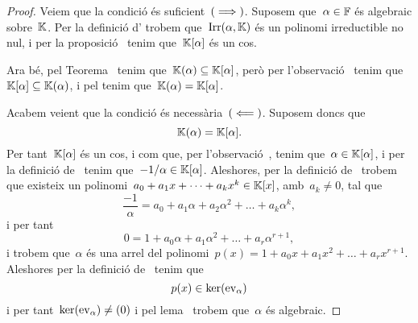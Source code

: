 \documentclass[../Apunts.tex]{subfiles}
\begin{document}
	\begin{proof} %
		Veiem que la condició és suficient~\((\implies)\). Suposem que~\(\alpha\in\mathbb{F}\) és algebraic sobre~\(\mathbb{K}\). Per la definició d' trobem que~\(\operatorname{Irr}(\alpha,\mathbb{K})\) és un polinomi irreductible no nul, i per la proposició~ tenim que~\(\mathbb{K}[\alpha]\) és un cos.
		
		Ara bé, pel Teorema~ tenim que~\(\mathbb{K}(\alpha)\subseteq\mathbb{K}[\alpha]\), però per l'observació~ tenim que~\(\mathbb{K}[\alpha]\subseteq\mathbb{K}(\alpha)\), i pel  tenim que~\(\mathbb{K}(\alpha)=\mathbb{K}[\alpha]\).
		
		Acabem veient que la condició és necessària~\((\impliedby)\). Suposem doncs que
		\[\mathbb{K}(\alpha)=\mathbb{K}[\alpha].\]
		Per tant~\(\mathbb{K}[\alpha]\) és un cos, i com que, per l'observació~, tenim que~\(\alpha\in\mathbb{K}[\alpha]\), i per la definició de~ tenim que~\(-1/\alpha\in\mathbb{K}[\alpha]\). Aleshores, per la definició de~ trobem que existeix un polinomi~\(a_{0}+a_{1}x+\dots+a_{k}x^{k}\in\mathbb{K}[x]\), amb~\(a_{k}\neq0\), tal que
		\[\frac{-1}{\alpha}=a_{0}+a_{1}\alpha+a_{2}\alpha^{2}+\dots+a_{k}\alpha^{k},\]
		i per tant
		\[0=1+a_{0}\alpha+a_{1}\alpha^{2}+\dots+a_{r}\alpha^{r+1},\]
		i trobem que~\(\alpha\) és una arrel del polinomi~\(p(x)=1+a_{0}x+a_{1}x^{2}+\dots+a_{r}x^{r+1}\). Aleshores per la definició de~ tenim que
		\[p(x)\in\operatorname{ker}(\mathrm{ev}_{\alpha})\]
		i per tant~\(\operatorname{ker}(\mathrm{ev}_{\alpha})\neq(0)\) i pel lema~ trobem que~\(\alpha\) és algebraic.
	\end{proof}
\end{document}
